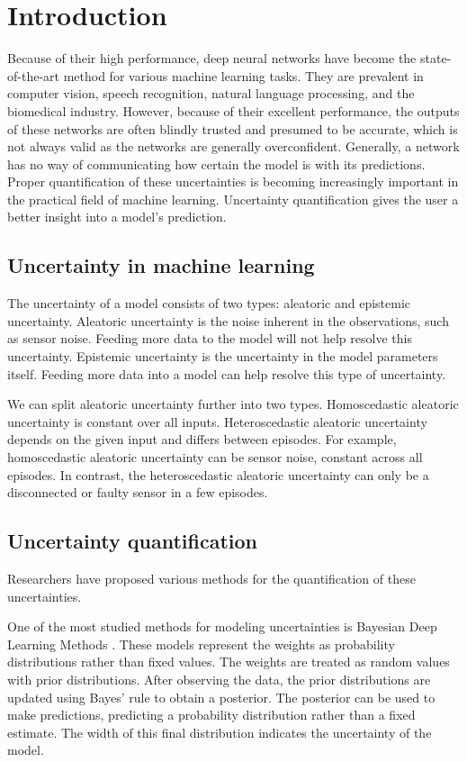 \section{Introduction}\label{sec:introduction}

Because of their high performance, deep neural networks have become the state-of-the-art method for various machine learning tasks. They are prevalent in computer vision, speech recognition, natural language processing, and the biomedical industry. However, because of their excellent performance, the outputs of these networks are often blindly trusted and presumed to be accurate, which is not always valid as the networks are generally overconfident. Generally, a network has no way of communicating how certain the model is with its predictions. Proper quantification of these uncertainties is becoming increasingly important in the practical field of machine learning. Uncertainty quantification gives the user a better insight into a model's prediction.

\subsection{Uncertainty in machine learning}

The uncertainty of a model consists of two types: aleatoric and epistemic uncertainty. Aleatoric uncertainty is the noise inherent in the observations, such as sensor noise. Feeding more data to the model will not help resolve this uncertainty. Epistemic uncertainty is the uncertainty in the model parameters itself. Feeding more data into a model can help resolve this type of uncertainty.

We can split aleatoric uncertainty further into two types. Homoscedastic aleatoric uncertainty is constant over all inputs. Heteroscedastic aleatoric uncertainty depends on the given input and differs between episodes. For example, homoscedastic aleatoric uncertainty can be sensor noise, constant across all episodes. In contrast, the heteroscedastic aleatoric uncertainty can only be a disconnected or faulty sensor in a few episodes.

\subsection{Uncertainty quantification}

Researchers have proposed various methods for the quantification of these uncertainties. 

One of the most studied methods for modeling uncertainties is Bayesian Deep Learning Methods \citep{kendall2017uncertainties, chen2020uncertainty}. These models represent the weights as probability distributions rather than fixed values. The weights are treated as random values with prior distributions. After observing the data, the prior distributions are updated using Bayes' rule to obtain a posterior. The posterior can be used to make predictions, predicting a probability distribution rather than a fixed estimate. The width of this final distribution indicates the uncertainty of the model.

